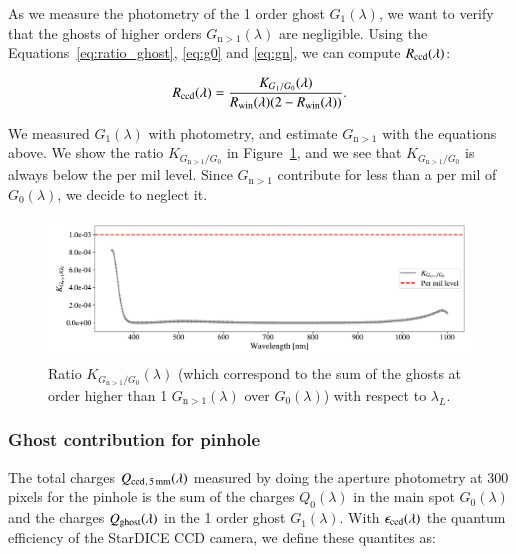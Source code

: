 \noindent As we measure the photometry of the 1 order ghost $G_1(\lambda)$, we want to verify that the ghosts of higher orders $G_{\mathrm{n}>1}(\lambda)$ are negligible. Using the Equations~\ref{eq:ratio_ghost}, \ref{eq:g0} and \ref{eq:gn}, we can compute $R_{\mathrm{ccd}}(\lambda)$:

\begin{equation}
    R_{\mathrm{ccd}}(\lambda) = \frac{K_{G_1/G_0}(\lambda)}{R_{\mathrm{win}}(\lambda) (2 - R_{\mathrm{win}}(\lambda))}.
    \label{eq:rccd}
\end{equation}

We measured $G_1(\lambda)$ with photometry, and estimate $G_{\mathrm{n}>1}$ with the equations above. We show the ratio $K_{G_{\mathrm{n}>1}/G_0}$ in Figure~\ref{fig:ratio_ginf_g0}, and we see that $K_{G_{\mathrm{n}>1}/G_0}$ is always below the per mil level. Since $G_{\mathrm{n}>1}$ contribute for less than a per mil of $G_0(\lambda)$, we decide to neglect it.

\begin{figure}[h]
    \centering
    \includegraphics[width=\columnwidth]{fig/ratio_g1_ginf.pdf}
    \caption{Ratio $K_{G_{\mathrm{n}>1}/G_0}(\lambda)$ (which correspond to the sum of the ghosts at order higher than 1 $G_{\mathrm{n}>1}(\lambda)$ over $G_0(\lambda)$) with respect to $\lambda_L$.}
    \label{fig:ratio_ginf_g0}
\end{figure}

\subsubsection{Ghost contribution for \bpinhole pinhole}

The total charges $Q_{\mathrm{ccd}}{}_{, \, \SI{5}{\milli\meter}}(\lambda)$ measured by doing the aperture photometry at 300 pixels for the \bpinhole pinhole is the sum of the charges $Q_0(\lambda)$ in the main spot $G_0(\lambda)$ and the charges $Q_{\mathrm{ghost}}(\lambda)$ in the 1 order ghost $G_1(\lambda)$. With $\epsilon_{\mathrm{ccd}}(\lambda)$ the quantum efficiency of the StarDICE CCD camera, we define these quantites as:

